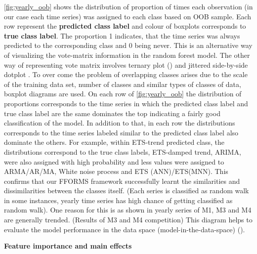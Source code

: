 \documentclass[11pt,a4paper,]{article}
\theoremstyle{definition}
\theoremstyle{definition}
\theoremstyle{definition}
\theoremstyle{remark}
\begin{document}
\ref{fig:yearly_oob} shows the distribution of proportion of times each
observation (in our case each time series) was assigned to each class
based on OOB sample. Each row represent the \textbf{predicted class
label} and colour of boxplots corresponds to \textbf{true class label}.
The proportion 1 indicates, that the time series was always predicted to
the corresponding class and 0 being never. This is an alternative way of
visualizing the vote-matrix information in the random forest model. The
other way of representing vote matrix involves ternary plot
(\textcite{sutherland2000orca}) and jittered side-by-side dotplot
\autocites{ehrlinger2015ggrandomforests}{da2017interactive}. To over
come the problem of overlapping classes arises due to the scale of the
training data set, number of classes and similar types of classes of
data, boxplot diagrams are used. On each row of \autoref{fig:yearly_oob}
the distribution of proportions corresponds to the time series in which
the predicted class label and true class label are the same dominates
the top indicating a fairly good classification of the model. In
addition to that, in each row the distributions corresponds to the time
series labeled similar to the predicted class label also dominate the
others. For example, within ETS-trend predicted class, the distributions
correspond to the true class labels, ETS-damped trend, ARIMA, were also
assigned with high probability and less values were assigned to
ARMA/AR/MA, White noise process and ETS (ANN)/ETS(MNN). This confirms
that our FFORMS framework successfully learnt the similarities and
dissimilarities between the classes itself. (Each series is classified
as random walk in some instances, yearly time series has high chance of
getting classified as random walk). One reason for this is as shown in
\textcite{kang2018efficient} yearly series of M1, M3 and M4 are
generally trended. (Results of M3 and M4 competition) This diagram helps
to evaluate the model performance in the data space
(model-in-the-data-space) (\textcite{da2017interactive}).

\textbf{Feature importance and main effects}
\end{document}
